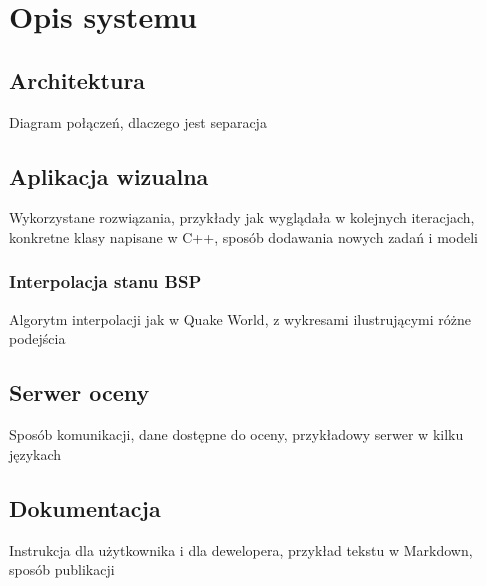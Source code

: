 \newpage
\section{Opis systemu}

\subsection{Architektura}
\begin{todo}
    Diagram połączeń, dlaczego jest separacja
\end{todo}

\subsection{Aplikacja wizualna}
\begin{todo}
    Wykorzystane rozwiązania, przykłady jak wyglądała w kolejnych iteracjach, konkretne klasy napisane w C++, sposób dodawania nowych zadań i modeli
\end{todo}

\subsubsection{Interpolacja stanu BSP}
\begin{todo}
    Algorytm interpolacji jak w Quake World, z wykresami ilustrującymi różne podejścia
\end{todo}

\subsection{Serwer oceny}
\begin{todo}
    Sposób komunikacji, dane dostępne do oceny, przykładowy serwer w kilku językach
\end{todo}

\subsection{Dokumentacja}
\begin{todo}
    Instrukcja dla użytkownika i dla dewelopera, przykład tekstu w Markdown, sposób publikacji
\end{todo}